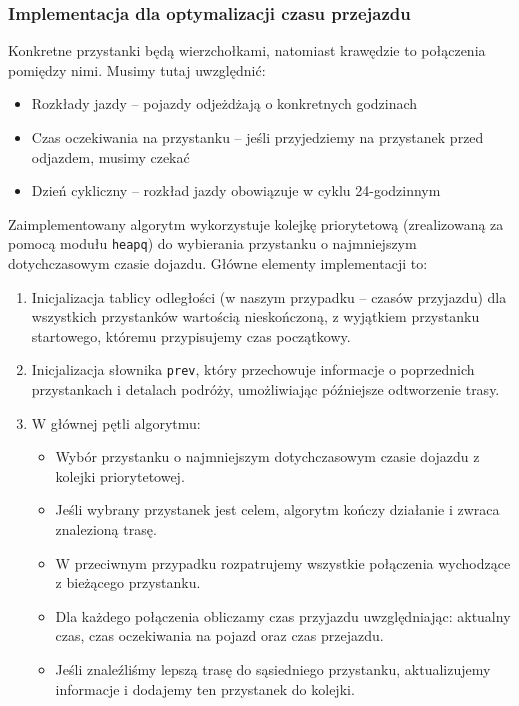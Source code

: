 \documentclass[12pt,a4paper]{article}
\begin{document}
\subsubsection{Implementacja dla optymalizacji czasu przejazdu}
Konkretne przystanki będą wierzchołkami, natomiast krawędzie to połączenia pomiędzy nimi. Musimy tutaj uwzględnić:

\begin{itemize}
    \item Rozkłady jazdy -- pojazdy odjeżdżają o konkretnych godzinach
    \item Czas oczekiwania na przystanku -- jeśli przyjedziemy na przystanek przed odjazdem, musimy czekać
    \item Dzień cykliczny -- rozkład jazdy obowiązuje w cyklu 24-godzinnym
\end{itemize}

Zaimplementowany algorytm wykorzystuje kolejkę priorytetową (zrealizowaną za pomocą modułu \texttt{heapq}) do wybierania przystanku o najmniejszym dotychczasowym czasie dojazdu. Główne elementy implementacji to:

\begin{enumerate}
    \item Inicjalizacja tablicy odległości (w naszym przypadku -- czasów przyjazdu) dla wszystkich przystanków wartością nieskończoną, z wyjątkiem przystanku startowego, któremu przypisujemy czas początkowy.
    \item Inicjalizacja słownika \texttt{prev}, który przechowuje informacje o poprzednich przystankach i detalach podróży, umożliwiając późniejsze odtworzenie trasy.
    \item W głównej pętli algorytmu:
    \begin{itemize}
        \item Wybór przystanku o najmniejszym dotychczasowym czasie dojazdu z kolejki priorytetowej.
        \item Jeśli wybrany przystanek jest celem, algorytm kończy działanie i zwraca znalezioną trasę.
        \item W przeciwnym przypadku rozpatrujemy wszystkie połączenia wychodzące z bieżącego przystanku.
        \item Dla każdego połączenia obliczamy czas przyjazdu uwzględniając: aktualny czas, czas oczekiwania na pojazd oraz czas przejazdu.
        \item Jeśli znaleźliśmy lepszą trasę do sąsiedniego przystanku, aktualizujemy informacje i dodajemy ten przystanek do kolejki.
    \end{itemize}
\end{enumerate}
\end{document}
